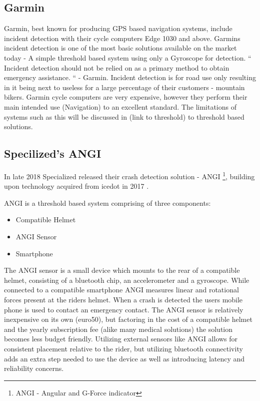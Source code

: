 \subsection{Garmin}
Garmin, best known for producing GPS based navigation systems, include incident detection with their cycle computers Edge 1030 and above. Garmins incident detection is one of the most basic solutions available on the market today - A simple threshold based system using only a Gyroscope for detection.   “ Incident detection should not be relied on as a primary method to obtain emergency assistance. “ - Garmin. Incident detection is for road use only resulting in it being next to useless for a  large percentage of their customers - mountain bikers. Garmin cycle computers are very expensive, however they perform their main intended use (Navigation) to an excellent standard.  The limitations of systems such as this will be discussed in (link to threshold) to threshold based solutions.


\subsection{Specilized's ANGI}

In late 2018 Specialized released their crash detection solution - ANGI \footnote{ ANGI - Angular and G-Force indicator}, \cite {ANGI} building upon technology acquired from icedot in 2017 \cite{icedot}. 

ANGI is a threshold based system comprising of three components:

\begin{itemize}
\item Compatible Helmet
\item ANGI Sensor
\item Smartphone
\end{itemize}

The ANGI sensor is a small device which mounts to the rear of  a compatible helmet, consisting of a bluetooth chip, an accelerometer and a gyroscope. While connected to a compatible smartphone ANGI measures linear and rotational forces present at the riders helmet. When a crash is detected the users mobile phone is used to contact an emergency contact. The ANGI sensor is relatively inexpensive on its own (euro50), but factoring in the cost of a compatible helmet and the yearly subscription fee (alike many medical solutions) the solution becomes less budget friendly. Utilizing external sensors like ANGI allows for consistent placement relative to the rider, but utilizing bluetooth connectivity adds an extra step needed to use the device as well as introducing latency and reliability concerns.


